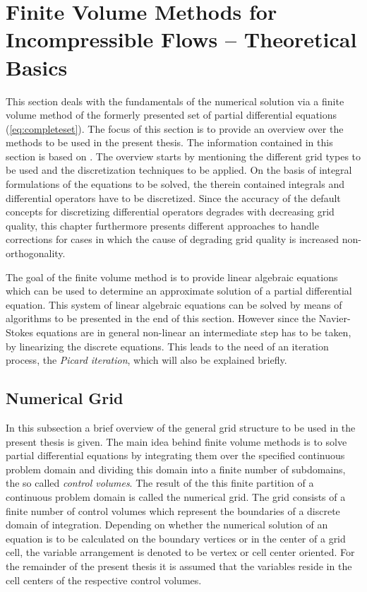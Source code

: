 \section{Finite Volume Methods for Incompressible Flows -- Theoretical Basics}

This section deals with the fundamentals of the numerical solution via a finite volume method of the formerly presented set of partial differential equations (\ref{eq:completeset}). The focus of this section is to provide an overview over the methods to be used in the present thesis. The information contained in this section is based on \cite{ferziger02,jasak96,schaefer99,muzaferja}. The overview starts by mentioning the different grid types to be used and the discretization techniques to be applied. On the basis of integral formulations of the equations to be solved, the therein contained integrals and differential operators have to be discretized. Since the accuracy of the default concepts for discretizing differential operators degrades with decreasing grid quality, this chapter furthermore presents different approaches to handle corrections for cases in which the cause of degrading grid quality is increased non-orthogonality. 
  
The goal of the finite volume method is to provide linear algebraic equations which can be used to determine an approximate solution of a partial differential equation. This system of linear algebraic equations can be solved by means of algorithms to be presented in the end of this section. However since the Navier-Stokes equations are in general non-linear an intermediate step has to be taken, by linearizing the discrete equations. This leads to the need of an iteration process, the \emph{Picard iteration}, which will also be explained briefly.
      
\subsection{Numerical Grid}

In this subsection a brief overview of the general grid structure to be used in the present thesis is given. The main idea behind finite volume methods is to solve partial differential equations by integrating them over the specified continuous problem domain and dividing this domain into a finite number of subdomains, the so called \emph{control volumes}. The result of the this finite partition of a continuous problem domain is called the numerical grid. The grid consists of a finite number of control volumes which represent the boundaries of a discrete domain of integration. Depending on whether the numerical solution of an equation is to be calculated on the boundary vertices or in the center of a grid cell, the variable arrangement is denoted to be vertex or cell center oriented. For the remainder of the present thesis it is assumed that the variables reside in the cell centers of the respective control volumes.


